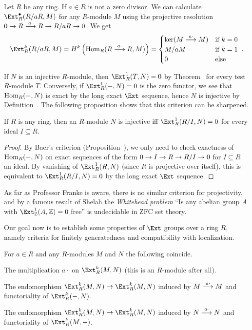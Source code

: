 \documentclass[a4paper,parskip=half,numbers=enddot, DIV=12]{scrreprt}
\begin{document}
\begin{example*}
	Let $R$ be any ring. If $a\in R$ is not a zero divisor. We can calculate $\Ext_R^\bullet(R/aR,M)$ for any $R$-module $M$ using the projective resolution $0\morphism R\morphism[ a\cdot]R\morphism R/aR\morphism 0$. We get
	\begin{align*}
		\Ext_R^k(R/aR,M)=H^k\left(\Hom_R(R\morphism[ a\cdot]R,M)\right)=\begin{cases}
			\ker(M\morphism[ a\cdot]M) & \text{if }k=0\\
			M/aM & \text{if }k=1\\
			0 & \text{else}
		\end{cases}\;.
	\end{align*}
\end{example*}
If $N$ is an injective $R$-module, then $\Ext_R^1(T,N)=0$ by Theorem~ for every test $R$-module $T$. Conversely, if $\Ext_R^1(-,N)=0$ is the zero functor, we see that $\operatorname{Hom}_R(-,N)$ is exact by the long exact $\Ext$ sequence, hence $N$ is injective by Definition~. The following proposition shows that this criterion can be sharpened.
\begin{prop}
	If $R$ is any ring, then an $R$-module $N$ is injective iff $\Ext_R^1(R/I,N)=0$ for every ideal $I\subseteq R$.
\end{prop}
\begin{proof}
	By Baer's criterion (Proposition~), we only need to check exactness of $\operatorname{Hom}_R(-,N)$ on exact sequences of the form $0\morphism I\morphism R\morphism R/I\morphism 0$ for $I\subseteq R$ an ideal. By vanishing of $\Ext_R^1(R,N)$ (since $R$ is projective over itself), this is equivalent to $\Ext_R^1(R/I,N)=0$ by the long exact $\Ext$ sequence.
\end{proof}
\begin{rem*}
	As far as Professor Franke is aware, there is no similar criterion for projectivity, and by a famous result of Shelah the \emph{Whitehead problem} ``Is any abelian group $A$ with $\Ext_\IZ^1(A,\IZ)=0$ free'' is undecidable in ZFC set theory.
\end{rem*}
Our goal now is to establish some properties of $\Ext$ groups over a ring $R$, namely criteria for finitely generatedness and compatibility with localization.
\begin{fact}
	For $a\in R$ and any $R$-modules $M$ and $N$ the following coincide.
	\begin{alphanumerate}
		\item The multiplication $a\cdot $ on $\Ext_R^k(M,N)$ (this is an $R$-module after all).
		\item The endomorphism $\Ext_R^k(M,N)\morphism\Ext_R^k(M,N)$ induced by $M\morphism[ a\cdot]M$ and functoriality of $\Ext_R^k(-,N)$.
		\item The endomorphism $\Ext_R^k(M,N)\morphism\Ext_R^k(M,N)$ induced by $N\morphism[ a\cdot]N$ and functoriality of $\Ext_R^k(M,-)$.
	\end{alphanumerate}
\end{fact}
\end{document}

